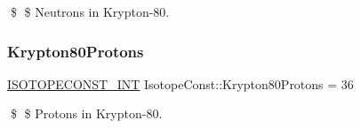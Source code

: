 \$ \$ Neutrons in Krypton-\/80. \mbox{\label{group___isotope_const-_krypton-_kr80_ga072da453dd6d92b810cc6cfbbd4df818}} 
\subsubsection{\texorpdfstring{Krypton80\+Protons}{Krypton80Protons}}
{\footnotesize\ttfamily \mbox{\hyperlink{group___isotope_const-_macros_ga5f18360b3e99483a35c32d789e62621c}{I\+S\+O\+T\+O\+P\+E\+C\+O\+N\+S\+T\+\_\+\+I\+NT}} Isotope\+Const\+::\+Krypton80\+Protons = 36}

\$ \$ Protons in Krypton-\/80. 